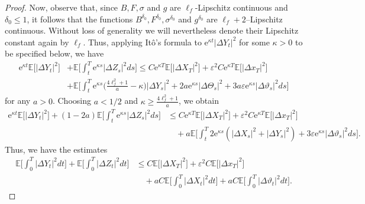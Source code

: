 \documentclass[11pt,reqno]{amsart}
\numberwithin{equation}{section}
\theoremstyle{definition}
\def\E{{\mathbb E}}
\def \E{\mathbb{E}}
\def \e{\mathrm{e}}
\begin{document}
\begin{proof}
  Now, observe that, since $B, F, \sigma$ and $g$ are $\ell_f$-Lipschitz continuous and $\delta_0\le 1$, 
  it follows that the functions $B^{\delta_0}, F^{\delta_0}, \sigma^{\delta_0}$ and $g^{\delta_0}$  are $\ell_f + 2$--Lipschitz continuous.
  Without loss of generality we will nevertheless denote their Lipschitz constant again by $\ell_f$.
  Thus, applying It\^o's formula to $\e^{\kappa t}|\Delta Y_t|^2$ for some $\kappa>0$ to be specified below, we have
  \begin{align*}
    \e^{\kappa t}\E\big[|\Delta Y_t|^2\big] &+ \E\bigg[\int_t^T\e^{\kappa s}|\Delta Z_s|^2ds \bigg] \le C\e^{\kappa T}\E\big[|\Delta X_T|^2\big] + \varepsilon^2C\e^{\kappa T}\E\big[|\Delta x_T|^2\big]\\
    &+\E\bigg[\int_t^T\e^{\kappa s}\Big(\frac{4\ell_f^2 + 1}{a} - \kappa\Big)|\Delta Y_s|^2 + 2a\e^{\kappa s}|\Delta \Theta_s|^2 + 3a\varepsilon\e^{\kappa s}|\Delta \vartheta_s|^2 ds\bigg] 
  \end{align*}
  for any $a>0$.
  Choosing $a<1/2$ and $\kappa\ge \frac{4\ell_f^2 + 1}{a}$, we obtain
  \begin{align*}
    \e^{\kappa t}\E\big[|\Delta Y_t|^2\big] + (1-2a)\E\bigg[\int_t^T\e^{\kappa s}|\Delta Z_s|^2ds\bigg] &\le C\e^{\kappa T}\E\big[|\Delta X_T|^2\big] + \varepsilon^2C\e^{\kappa T}\E\big[|\Delta x_T|^2\big]\\
      &\quad + a\E\bigg[\int_t^T2\e^{\kappa s}(|\Delta X_s|^2 + |\Delta Y_s|^2) + 3\varepsilon\e^{\kappa s}|\Delta \vartheta_s|^2ds\bigg].
  \end{align*}
  Thus, we have the estimates
  \begin{align*}
    \E\bigg[\int_0^T|\Delta Y_t|^2dt\bigg] + \E\bigg[\int_0^T|\Delta Z_t|^2dt \bigg] &\le C\E\big[|\Delta X_T|^2\big] + \varepsilon^2C\E\big[|\Delta x_T|^2\big]\\
    &\quad + a C\E\bigg[\int_0^T|\Delta X_t|^2dt\bigg] + aC\E\bigg[\int_0^T|\Delta\vartheta_t|^2dt\bigg].
  \end{align*}


\end{proof}
\end{document}
